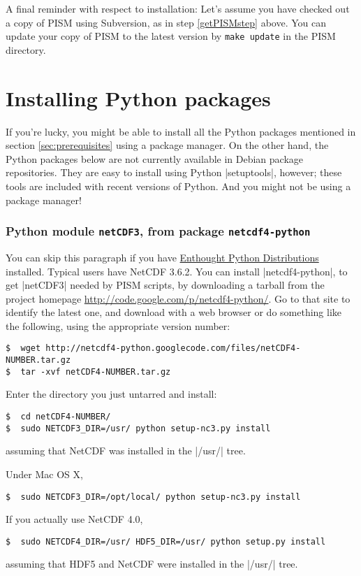 \documentclass[11pt,final]{amsart}
\begin{document}
A final reminder with respect to installation:  Let's assume you have checked out a copy of PISM using Subversion, as in step \ref{getPISMstep} above.  You can update your copy of PISM to the latest version by \verb|make update| in the PISM directory.


\newpage
\section{Installing Python packages}
\label{sec:python}

If you're lucky, you might be able to install all the Python packages mentioned in section \ref{sec:prerequisites} using a package manager. On the other hand, the Python packages below are not currently available in Debian package repositories. They are easy to install using Python |setuptools|, however; these tools are included with recent versions of Python.  And you might not be using a package manager!

\subsubsection*{Python module \texttt{netCDF3}, from package \texttt{netcdf4-python}}  You can skip this paragraph if you have \href{http://www.enthought.com/}{Enthought Python Distributions} installed. Typical users have NetCDF 3.6.2.  You can install |netcdf4-python|, to get |netCDF3| needed by PISM scripts, by downloading a tarball from the project homepage \url{http://code.google.com/p/netcdf4-python/}.  Go to that site to identify the latest one, and download with a web browser or do something like the following, using the appropriate version number:
\begin{verbatim}
$  wget http://netcdf4-python.googlecode.com/files/netCDF4-NUMBER.tar.gz
$  tar -xvf netCDF4-NUMBER.tar.gz
\end{verbatim}
Enter the directory you just untarred and install:
\begin{verbatim}
$  cd netCDF4-NUMBER/
$  sudo NETCDF3_DIR=/usr/ python setup-nc3.py install
\end{verbatim}
assuming that NetCDF was installed in the |/usr/| tree.

Under Mac OS X,
\begin{verbatim}
$  sudo NETCDF3_DIR=/opt/local/ python setup-nc3.py install
\end{verbatim}
If you actually use NetCDF 4.0,
\begin{verbatim}
$  sudo NETCDF4_DIR=/usr/ HDF5_DIR=/usr/ python setup.py install
\end{verbatim}
assuming that HDF5 and NetCDF were installed in the |/usr/| tree.
\end{document}
